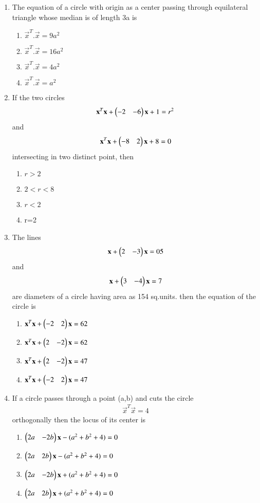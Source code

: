 \begin{enumerate}[label=\arabic*.,ref=\thesubsection.\theenumi]
\item The equation of a circle with origin as a center passing through equilateral triangle whose median is of length 3a is
\begin{enumerate}
\item $\vec x^T .\vec x=9a^2$
\item $\vec x^T .\vec x=16a^2$
\item $\vec x^T .\vec x=4a^2$
\item $\vec x^T .\vec x=a^2$
\end{enumerate}
    
\item If the two circles 
\begin{align}
\mathbf x^T\mathbf x+\begin{pmatrix}-2&-6\end{pmatrix}\mathbf x+1=r^2
\end{align} 
and 
\begin{align}
\mathbf x^T\mathbf x+\begin{pmatrix}-8&2\end{pmatrix}\mathbf x+8=0
\end{align} 
intersecting in two distinct point, then
\begin{enumerate}
\item $r > 2$
\item $2< r < 8$
\item $ r < 2$
\item r=2
\end{enumerate}
    
\item The lines 
\begin{align}
\mathbf x+\begin{pmatrix}2&-3\end{pmatrix}
\mathbf x=05
\end{align} 
and 
\begin{align}
\mathbf x+\begin{pmatrix}3&-4\end{pmatrix}\mathbf x=7
\end{align} 
are diameters of a circle having area as 154 sq.units. then the equation of the circle is
\begin{enumerate}
\item $\mathbf x^T\mathbf x+\begin{pmatrix}-2&2\end{pmatrix}\mathbf x=62$
\item $\mathbf x^T\mathbf x+\begin{pmatrix}2&-2\end{pmatrix}\mathbf x=62$
\item $\mathbf x^T\mathbf x+\begin{pmatrix}2&-2\end{pmatrix}\mathbf x=47$
\item $\mathbf x^T\mathbf x+\begin{pmatrix}-2&2\end{pmatrix}\mathbf x=47$
\end{enumerate}
    
\item If a circle passes through a point (a,b) and cuts the circle 
\begin{align}
\vec x^T\vec x=4
\end{align} 
orthogonally then the locus of its center is
\begin{enumerate}
\item $\begin{pmatrix}2a&-2b\end{pmatrix}\mathbf x-(a^2+b^2+4)=0$
\item $\begin{pmatrix}2a&2b\end{pmatrix}\mathbf x-(a^2+b^2+4)=0$
\item $\begin{pmatrix}2a&-2b\end{pmatrix}\mathbf x+(a^2+b^2+4)=0$
\item $\begin{pmatrix}2a&2b\end{pmatrix}\mathbf x+(a^2+b^2+4)=0$
\end{enumerate}
    

\end{enumerate}
